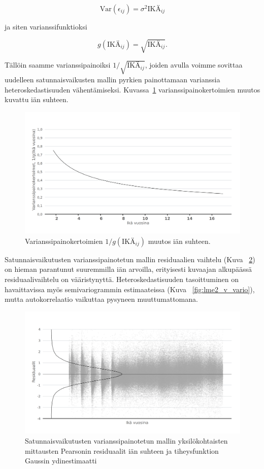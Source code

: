 \documentclass[finnish]{docopts}
\begin{document}
$$
\text{Var}(\epsilon_{ij}) = \sigma^2\text{IKÄ}_{ij}
$$

ja siten varianssifunktioksi

$$
g(\text{IKÄ}_{ij}) = \sqrt{\text{IKÄ}_{ij}}.
$$

Tällöin saamme varianssipainoiksi $1/\sqrt{\text{IKÄ}_{ij}}$, joiden avulla voimme sovittaa uudelleen satunnaisvaikusten mallin pyrkien painottamaan varianssia heteroskedastisuuden vähentämiseksi. Kuvassa~\ref{fig:lme2_varfunc} varianssipainokertoimien muutos kuvattu iän suhteen. \\

\begin{figure}[H]
\centering
  \includegraphics[scale=0.8]{kuvaajat/lme2_varfunc.png}
  \caption{Varianssipainokertoimien $1/g(\text{IKÄ}_{ij})$ muutos iän suhteen.}
  \label{fig:lme2_varfunc}
\end{figure}

Satunnaisvaikutusten varianssipainotetun mallin residuaalien vaihtelu (Kuva ~\ref{fig:lme2_ika_v_resid}) on hieman parantunut suuremmilla iän arvoilla, erityisesti kuvaajan alkupäässä residuaalivaihtelu on vääristynyttä. Heteroskedastisuuden tasoittuminen on havaittavissa myös semivariogrammin estimaateissa (Kuva ~\ref{fig:lme2_v_vario}), mutta autokorrelaatio vaikuttaa pysyneen muuttumattomana.\\

\begin{figure}[H]
\centering
  \includegraphics[scale=0.8]{kuvaajat/lme2_ika_v_residuaalit.png}
  \caption{Satunnaisvaikutusten varianssipainotetun mallin yksilökohtaisten mittausten Pearsonin residuaalit iän suhteen ja tiheysfunktion Gaussin ydinestimaatti}
  \label{fig:lme2_ika_v_resid}
\end{figure}
\end{document}

